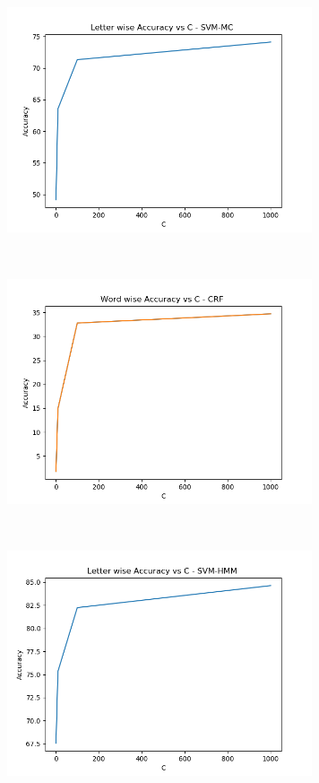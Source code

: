 \documentclass[11pt]{report}
\begin{document}
\begin{figure}[t!]
\begin{minipage}[b]{0.50\textwidth}
\centering 	
\vspace{-0.6em} 
\includegraphics[width=9cm]{SVM-MC_letter_wise.png}
\vspace{0.6em} 
\end{minipage} 
~~~ 
\begin{minipage}[b]{0.50\textwidth} 
\centering 	
\vspace{-0.6em} 
\includegraphics[width=9cm]{CRF_word_wise.png}
\vspace{0.6em} 
\end{minipage} 
~~~ 
\begin{minipage}[b]{0.50\textwidth} 
\centering 	
\vspace{-0.6em} 
\includegraphics[width=9cm]{SVM-HMM_letter_wise.png}

\end{minipage}
\end{figure}
\end{document}
